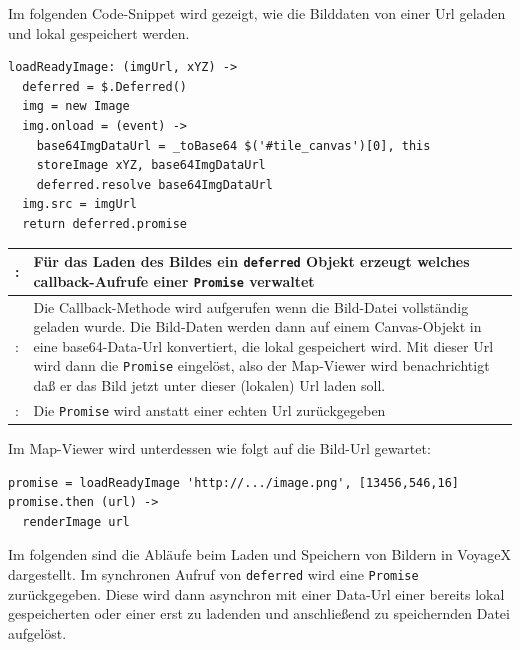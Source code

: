 Im folgenden Code-Snippet wird gezeigt, wie die Bilddaten von einer Url geladen und lokal gespeichert werden.
\lstset{language=CoffeeScript}
\begin{lstlisting}[frame=single,xleftmargin=0pt]
loadReadyImage: (imgUrl, xYZ) ->
  deferred = $.Deferred()
  img = new Image
  img.onload = (event) ->
    base64ImgDataUrl = _toBase64 $('#tile_canvas')[0], this
    storeImage xYZ, base64ImgDataUrl
    deferred.resolve base64ImgDataUrl
  img.src = imgUrl
  return deferred.promise  
\end{lstlisting}%
\begin{table}[H]
  \begin{tabulary}{\columnwidth}{>{\raggedleft}m{.5cm} L}
  : & Für das Laden des Bildes ein \texttt{deferred} Objekt erzeugt welches callback-Aufrufe einer \texttt{Promise} verwaltet \\ : & Die Callback-Methode wird aufgerufen wenn die Bild-Datei vollständig geladen wurde. Die Bild-Daten werden dann auf einem Canvas-Objekt in eine base64-Data-Url konvertiert, die lokal gespeichert wird. Mit dieser Url wird dann die \texttt{Promise} eingelöst, also der Map-Viewer wird benachrichtigt daß er das Bild jetzt unter dieser (lokalen) Url laden soll.\\ : & Die \texttt{Promise} wird anstatt einer echten Url zurückgegeben  \\ \hline
  \end{tabulary}
\end{table}
Im Map-Viewer wird unterdessen wie folgt auf die Bild-Url gewartet:
\lstset{language=CoffeeScript}
\begin{lstlisting}[frame=single,xleftmargin=0pt]
promise = loadReadyImage 'http://.../image.png', [13456,546,16]
promise.then (url) ->
  renderImage url
\end{lstlisting}
\vspace{2ex}
Im folgenden sind die Abläufe beim Laden und Speichern von Bildern in VoyageX dargestellt. Im synchronen Aufruf von \texttt{deferred} wird eine \texttt{Promise} zurückgegeben. Diese wird dann asynchron mit einer Data-Url einer bereits lokal gespeicherten oder einer erst zu ladenden und anschließend zu speichernden Datei aufgelöst.
